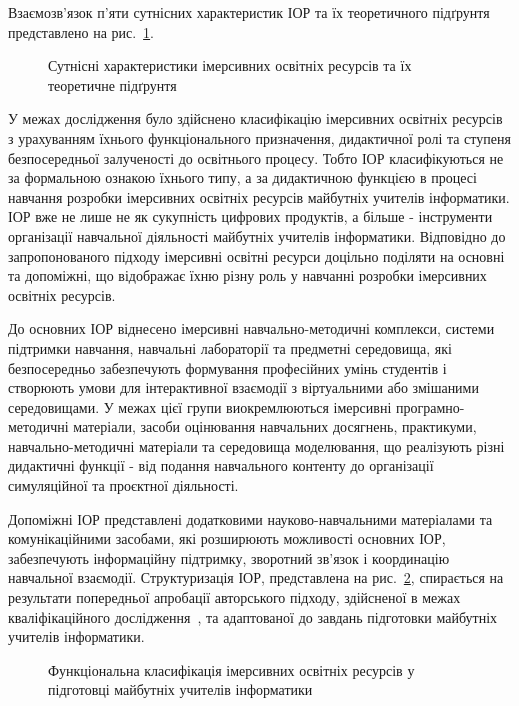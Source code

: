 Взаємозв'язок п'яти сутнісних характеристик ІОР та їх теоретичного підґрунтя представлено на рис.~\ref{fig:ier_chars}.

\begin{figure}[!h]
\centering

\caption{Сутнісні характеристики імерсивних освітніх ресурсів та їх теоретичне підґрунтя}
\label{fig:ier_chars}
\end{figure}

У межах дослідження було здійснено класифікацію імерсивних освітніх ресурсів з урахуванням їхнього функціонального призначення, дидактичної ролі та ступеня безпосередньої залученості до освітнього процесу. Тобто ІОР класифікуються не за формальною ознакою їхнього типу, а за дидактичною функцією в процесі навчання розробки імерсивних освітніх ресурсів майбутніх учителів інформатики. ІОР вже не лише не як сукупність цифрових продуктів, а більше - інструменти організації навчальної діяльності майбутніх учителів інформатики. Відповідно до запропонованого підходу імерсивні освітні ресурси доцільно поділяти на основні та допоміжні, що відображає їхню різну роль у навчанні розробки імерсивних освітніх ресурсів.

До основних ІОР віднесено імерсивні навчально-методичні комплекси, системи підтримки навчання, навчальні лабораторії та предметні середовища, які безпосередньо забезпечують формування професійних умінь студентів і створюють умови для інтерактивної взаємодії з віртуальними або змішаними середовищами. У межах цієї групи виокремлюються імерсивні програмно-методичні матеріали, засоби оцінювання навчальних досягнень, практикуми, навчально-методичні матеріали та середовища моделювання, що реалізують різні дидактичні функції - від подання навчального контенту до організації симуляційної та проєктної діяльності.

Допоміжні ІОР представлені додатковими науково-навчальними матеріалами та комунікаційними засобами, які розширюють можливості основних ІОР, забезпечують інформаційну підтримку, зворотний зв'язок і координацію навчальної взаємодії. Структуризація ІОР, представлена на рис.~\ref{fig:1.4}, спирається на результати попередньої апробації авторського підходу, здійсненої в межах кваліфікаційного дослідження~\cite{Shepiliev2019Master}, та адаптованої до завдань підготовки майбутніх учителів інформатики.

\begin{figure}[!h]
\centering

\caption{Функціональна класифікація імерсивних освітніх ресурсів у підготовці майбутніх учителів інформатики}
\label{fig:1.4}
\end{figure}

